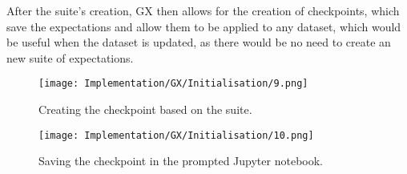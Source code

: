 \para After the suite's creation, GX then allows for the creation of checkpoints, which save the expectations and allow
them to be applied to any dataset, which would be useful when the dataset is updated, as there would be no need 
to create an new suite of expectations.

\begin{figure}[H]
    \centering
    \texttt{[image: Implementation/GX/Initialisation/9.png]}
    \caption{Creating the checkpoint based on the suite.}
    \label{fig:GXCheckpoint1}
\end{figure}

\begin{figure}[H]
    \centering
    \texttt{[image: Implementation/GX/Initialisation/10.png]}
    \caption{Saving the checkpoint in the prompted Jupyter notebook.}
    \label{fig:GXCheckpoint2}
\end{figure}

